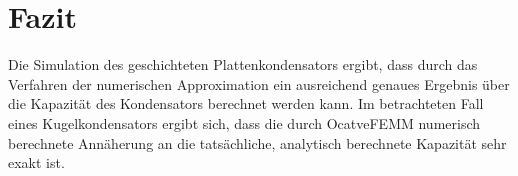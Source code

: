 \chapter{Fazit}\label{sec:fazit}
Die Simulation des geschichteten Plattenkondensators ergibt, dass durch das Verfahren der numerischen Approximation ein ausreichend genaues Ergebnis über die Kapazität des Kondensators berechnet werden kann. Im betrachteten Fall eines Kugelkondensators ergibt sich, dass die durch OcatveFEMM numerisch berechnete Annäherung an die tatsächliche, analytisch berechnete Kapazität sehr exakt ist.